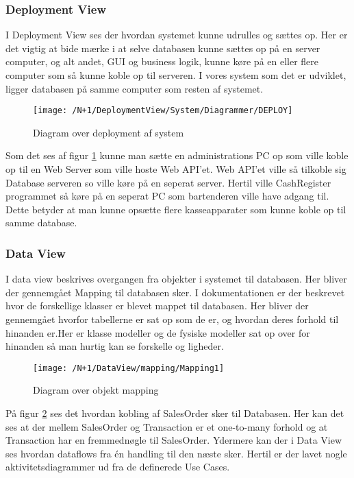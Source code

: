 \subsubsection{Deployment View}
I Deployment View ses der hvordan systemet kunne udrulles og sættes op. Her er det vigtig at bide mærke i at selve databasen kunne sættes op på en server computer, og alt andet, GUI og business logik, kunne køre på en eller flere computer som så kunne koble op til  serveren. I vores system som det er udviklet, ligger databasen på samme computer som resten af systemet. \newline\newline
\begin{figure}[H]
	\centering
	\texttt{[image: /N+1/DeploymentView/System/Diagrammer/DEPLOY]}
	\caption{Diagram over deployment af system}
	\label{fig:DeplayDia}
\end{figure}
Som det ses af figur \ref{fig:DeplayDia} kunne man sætte en administrations PC op som ville koble op til en Web Server som ville hoste Web API'et. Web API'et ville så tilkoble sig Database serveren so  ville køre på en seperat server. Hertil ville CashRegister programmet så køre på en seperat PC som bartenderen ville have adgang til. Dette betyder at man kunne opsætte flere kasseapparater som kunne koble op til samme database.  

\subsubsection{Data View}
I data view beskrives overgangen fra objekter i systemet til databasen. Her bliver der gennemgået Mapping til databasen sker.\newline\newline
I dokumentationen er der beskrevet hvor de forskellige klasser er blevet mappet til databasen. Her bliver der gennemgået hvorfor tabellerne er sat op som de er, og hvordan deres forhold til hinanden er.\newline Her er klasse modeller og de fysiske modeller sat op  over for hinanden så man hurtig kan se forskelle og ligheder.\newline 

\begin{figure}[H]
	\centering
	\texttt{[image: /N+1/DataView/mapping/Mapping1]}
	\caption{Diagram over objekt mapping}
	\label{MapDia}
\end{figure}	

På figur \ref{MapDia} ses det hvordan kobling af SalesOrder sker til Databasen. Her kan det ses at der mellem SalesOrder og Transaction er et one-to-many forhold og at Transaction har en fremmednøgle til SalesOrder.\newline\newline
Ydermere kan der i Data View ses hvordan dataflows fra én handling til den næste sker. Hertil er der lavet nogle aktivitetsdiagrammer ud fra de definerede Use Cases. 


